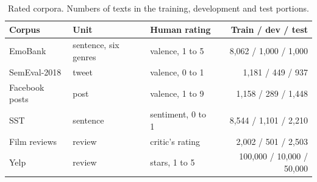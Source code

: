 \begin{table}[h]
\centering\sffamily\scriptsize
\caption{Rated corpora. Numbers of texts in the training, development and test portions.}
\label{tab:corpora}
\begin{tabular}{@{}lllr@{}}
\toprule
Corpus & Unit & Human rating & Train / dev / test \\
\midrule
EmoBank\cite{buechel2017} & sentence, six genres & valence, 1 to 5 & 8,062 / 1,000 / 1,000 \\
SemEval-2018\cite{mohammad2018semeval} & tweet & valence, 0 to 1 & 1,181 / 449 / 937 \\
Facebook posts\cite{preotiuc2016} & post & valence, 1 to 9 & 1,158 / 289 / 1,448 \\
SST\cite{socher2013} & sentence & sentiment, 0 to 1 & 8,544 / 1,101 / 2,210 \\
Film reviews\cite{pang2005} & review & critic's rating & 2,002 / 501 / 2,503 \\
Yelp\cite{zhang2015} & review & stars, 1 to 5 & 100,000 / 10,000 / 50,000 \\
\bottomrule
\end{tabular}
\end{table}

